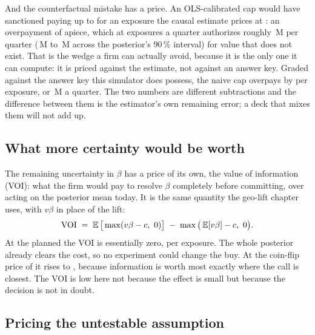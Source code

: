 And the counterfactual mistake has a price. An OLS-calibrated cap would have sanctioned paying up to
\eur{\nbElevenNaive} for an exposure the causal estimate prices at \eur{\nbElevenBayesMean}: an
overpayment of \eur{\nbElevenOverpay} apiece, which at \nbElevenVolume{} exposures a quarter
authorizes roughly \eur{\nbElevenOverpayM}\,M per quarter (\eur{\nbElevenOverpayMLo}\,M to
\eur{\nbElevenOverpayMHi}\,M across the posterior's 90\,\% interval) for value that does not
exist. That is the wedge a firm can actually avoid, because it is the only one it can compute: it is
priced against the estimate, not against an answer key. Graded against the answer key this simulator
does possess, the naive cap overpays by \eur{\nbElevenOverpayTrue} per exposure, or
\eur{\nbElevenOverpayTrueM}\,M a quarter. The two numbers are different subtractions and the
difference between them is the estimator's own remaining error; a deck that mixes them will not
add up.



\subsection*{What more certainty would be worth}

The remaining uncertainty in $\beta$ has a price of its own, the value of information (VOI): what
the firm would pay to resolve $\beta$ completely before committing, over acting on the posterior
mean today. It is the same quantity the geo-lift chapter uses, with $v\beta$ in place of the lift:
%
\begin{equation}
  \text{VOI} \;=\; \operatorname{\mathbb{E}}\big[\max(v\beta - c,\ 0)\big] \;-\; \max\big(\operatorname{\mathbb{E}}[v\beta] - c,\ 0\big).
  \label{eq:iv:voi}
\end{equation}
%
At the planned \eur{\nbElevenCost} the VOI is essentially zero, \eur{\nbElevenVoi} per exposure. The
whole posterior already clears the cost, so no experiment could change the buy. At the coin-flip
price of \eur{\nbElevenCoinflip} it rises to \eur{\nbElevenVoiCoin}, because information is worth most
exactly where the call is closest. The VOI is low here not because the effect is small but because
the decision is not in doubt.

\subsection*{Pricing the untestable assumption}

